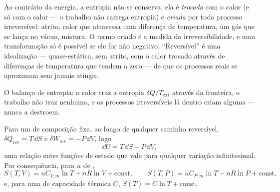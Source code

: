 \begin{remark}\label{rem:b1:second-law-entropy:reading}
Ao contrário da energia, a entropia não se conserva: ela é \emph{trocada}
com o calor (e só com o calor --- o trabalho não carrega entropia) e
\emph{criada} por todo processo irreversível: atrito, calor que atravessa
uma diferença de temperatura, um gás que se lança no vácuo, mistura. O
termo criado é a medida da irreversibilidade, e uma transformação só é
possível se ele for não negativo. ``Reversível'' é uma idealização ---
quase-estática, sem atrito, com o calor trocado através de diferenças de
temperatura que tendem a zero --- de que os processos reais se aproximam sem jamais atingir.
\end{remark}

\begin{omfigure}

{\small O balanço de entropia: o calor traz a entropia $\delta Q/T_{\mathrm{ext}}$
através da fronteira, o trabalho não traz nenhuma, e os processos
irreversíveis lá dentro criam alguma --- nunca a destroem.}
\end{omfigure}

\begin{proposition}\label{prop:b1:second-law-entropy:identity}
Para um  de composição fixa, ao longo de qualquer caminho reversível,
$\delta Q_{\mathrm{rev}} = T\,\dd S$ e $\delta W_{\mathrm{rev}} = -P\,\dd V$, logo
\[
\dd U = T\,\dd S - P\,\dd V ,
\]
uma relação entre funções de estado que vale para qualquer variação
infinitesimal. Por consequência, para $n$  de ,
\[
S(T, V) = nC_{V,m}\ln T + nR\ln V + \text{const}, \qquad
S(T, P) = nC_{P,m}\ln T - nR\ln P + \text{const},
\]
e, para uma  de capacidade térmica $C$, $S(T) = C\ln T + \text{const}$.
\end{proposition}

